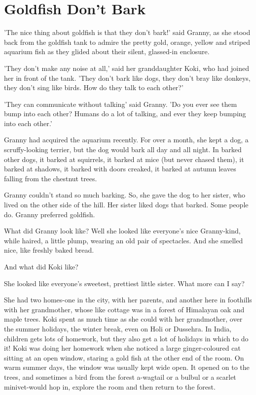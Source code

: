 \chapter{Goldfish Don't Bark}
'The nice thing about goldfish is that they don't bark!' said Granny, as she stood back from the goldfish tank to admire the pretty gold, orange, yellow and striped aquarium fish as they glided about their silent, glassed-in enclosure.
\par
'They don't make any noise at all,' said her granddaughter Koki, who had joined her in front of the tank. 'They don't bark like dogs, they don't bray like donkeys, they don't sing like birds. How do they talk to each other?'
\par
'They can communicate without talking' said Granny. 'Do you ever see them bump into each other? Humans do a lot of talking, and ever they keep bumping into each other.'
\par
Granny had acquired the aquarium recently. For over a month, she kept a dog, a scruffy-looking terrier, but the dog would bark all day and all night. In barked other dogs, it barked at squirrels, it barked at mice (but never chased them), it barked at shadows, it barked with doors creaked, it barked at autumn leaves falling from the chestnut trees.
\par
Granny couldn't stand so much barking. So, she gave the dog to her sister, who lived on the other side of the hill. Her sister liked dogs that barked. Some people do. Granny preferred goldfish.
\par
What did Granny look like? Well she looked like everyone's nice Granny-kind, while haired, a little plump, wearing an old pair of spectacles. And she smelled nice, like freshly baked bread.
\par
And what did Koki like?
\par
She looked like everyone's sweetest, prettiest little sister. What more can I say?
\par
She had two homes-one in the city, with her parents, and another here in foothills with her grandmother, whose like cottage was in a forest of Himalayan oak and maple trees. Koki spent as much time as she could with her grandmother, over the summer holidays, the winter break, even on Holi or Dussehra. In India, children gets lots of homework, but they also get a lot of holidays in which to do it!
Koki was doing her homework when she noticed a large ginger-coloured cat sitting at an open window, staring a gold fish at the other end of the room. On warm summer days, the window was usually kept wide open. It opened on to the trees, and sometimes a bird from the forest a-wagtail or a bulbul or a scarlet minivet-would hop in, explore the room and then return to the forest.
